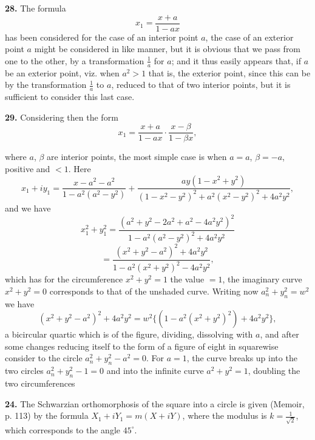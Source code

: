 \documentclass[11pt,a4paper]{article}
\begin{document}
\textbf{28.} The formula
\[
x_1 = \frac{x + a}{1 - ax}
\]
has been considered for the case of an interior point $a$, the case of an exterior point $a$ might be considered in like manner, but it is obvious that we pass from one to the other, by a transformation $\frac{1}{a}$ for $a$; and it thus easily appears that, if $a$ be an exterior point, viz. when $a^2 > 1$ that is, the exterior point, since this can be by the transformation $\frac{1}{a}$ to $a$, reduced to that of two interior points, but it is sufficient to consider this last case.

\textbf{29.} Considering then the form
\[
x_1 = \frac{x + a}{1 - ax} \cdot \frac{x - \beta}{1 - \beta x},
\]

where $a$, $\beta$ are interior points, the most simple case is when $a = a$, $\beta = -a$, positive and $< 1$. Here
\[
x_1 + iy_1 = \frac{x - a^2 - a^2}{1 - a^2(a^2 - y^2)} + \frac{ay(1 - x^2 + y^2)}{(1 - x^2 - y^2)^2 + a^2(x^2 - y^2)^2 + 4a^2 y^2},
\]
and we have
\[
x_1^2 + y_1^2 = \frac{(a^2 + y^2 - 2a^2 + a^2 - 4a^2 y^2)^2}{1 - a^2(a^2 - y^2)^2 + 4a^2 y^2}
\]
\[
= \frac{(x^2 + y^2 - a^2)^2 + 4a^2 y^2}{1 - a^2(x^2 + y^2)^2 - 4a^2 y^2},
\]
which has for the circumference $x^2 + y^2 = 1$ the value $= 1$, the imaginary curve $x^2 + y^2 = 0$ corresponds to that of the unshaded curve. Writing now $a_n^2 + y_n^2 = w^2$ we have
\[
(x^2 + y^2 - a^2)^2 + 4a^2 y^2 = w^2 \{(1 - a^2(x^2 + y^2)^2) + 4a^2 y^2\},
\]
a bicircular quartic which is of the figure, dividing, dissolving with $a$, and after some changes reducing itself to the form of a figure of eight in squarewise consider to the circle $a_n^2 + y_n^2 - a^2 = 0$. For $a = 1$, the curve breaks up into the two circles $a_n^2 + y_n^2 - 1 = 0$ and into the infinite curve $a^2 + y^2 = 1$, doubling the two circumferences

\textbf{24.} The Schwarzian orthomorphosis of the square into a circle is given (Memoir, p. 113) by the formula $X_1 + iY_1 = m (X + iY)$, where the modulus is $k = \frac{1}{\sqrt{2}}$, which corresponds to the angle $45^\circ$.
\end{document}
